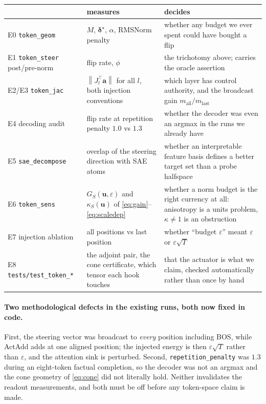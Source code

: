 \documentclass[11pt]{article}
\newcommand{\va}{\bm{a}}
\newcommand{\vd}{\bm{\delta}}
\newcommand{\vu}{\bm{u}}
\newcommand{\norm}[1]{\left\lVert #1 \right\rVert}
\begin{document}
\begin{table}[h]\centering\small
\begin{tabular}{@{}L{3.3cm}L{4.9cm}L{7.3cm}@{}}
\toprule
& measures & decides \\
\midrule
E0 \texttt{token\_geom} & $M$, $\vd^\star$, $\alpha$, RMSNorm penalty & whether any
  budget we ever spent could have bought a flip \\
E1 \texttt{token\_steer} post/pre-norm & flip rate, $\phi$ & the trichotomy above;
  carries the oracle assertion \\
E2/E3 \texttt{token\_jac} & $\norm{J_l^{\!\top}\va}$ for all $l$, both injection
  conventions & which layer has control authority, and the broadcast gain
  $m_{\text{all}}/m_{\text{last}}$ \\
E4 decoding audit & flip rate at repetition penalty $1.0$ vs $1.3$ & whether the
  decoder was even an argmax in the runs we already have \\
E5 \texttt{sae\_decompose} & overlap of the steering direction with SAE atoms &
  whether an interpretable feature basis defines a better target set than a probe
  halfspace \\
E6 \texttt{token\_sens} & $G_S(\vu,\varepsilon)$ and $\kappa_S(\vu)$ of
  \eqref{eq:gain}--\eqref{eq:scaledep} & whether a norm budget is the right currency at
  all: anisotropy is a units problem, $\kappa \neq 1$ is an obstruction \\
E7 injection ablation & all positions vs last position & whether ``budget
  $\varepsilon$'' meant $\varepsilon$ or $\varepsilon\sqrt{T}$ \\
E8 \texttt{tests/test\_token\_*} & the adjoint pair, the cone certificate, which
  tensor each hook touches & that the actuator is what we claim, checked automatically
  rather than once by hand \\
\bottomrule
\end{tabular}
\end{table}

\paragraph{Two methodological defects in the existing runs, both now fixed in code.}
First, the steering vector was broadcast to \emph{every} position including BOS, while
ActAdd adds at one aligned position; the injected energy is then $\varepsilon\sqrt{T}$
rather than $\varepsilon$, and the attention sink is perturbed. Second,
\texttt{repetition\_penalty} was $1.3$ during an eight-token factual completion, so the
decoder was not an argmax and the cone geometry of \eqref{eq:cone} did not literally
hold. Neither invalidates the readout measurements, and both must be off before any
token-space claim is made.
\end{document}

